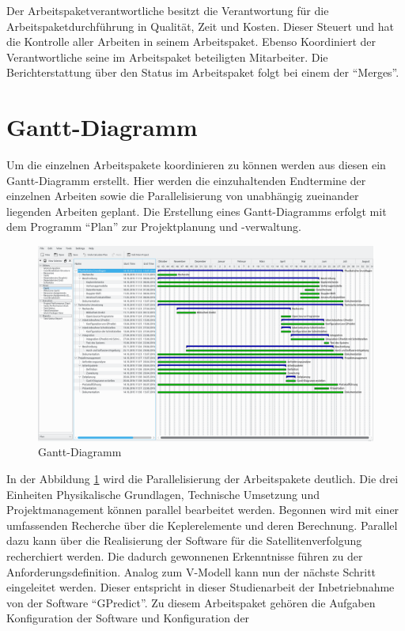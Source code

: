 Der Arbeitspaketverantwortliche besitzt die Verantwortung für die Arbeitspaketdurchführung in 
Qualität, Zeit und Kosten. Dieser Steuert und hat die Kontrolle aller Arbeiten in seinem 
Arbeitspaket. Ebenso Koordiniert der Verantwortliche seine im Arbeitspaket beteiligten Mitarbeiter. 
Die Berichterstattung über den Status im Arbeitspaket folgt bei einem der ``Merges''.
\newpar

\section{Gantt-Diagramm}
Um die einzelnen Arbeitspakete koordinieren zu können werden aus diesen ein Gantt-Diagramm 
erstellt. Hier werden die einzuhaltenden Endtermine der einzelnen Arbeiten sowie die 
Parallelisierung von unabhängig zueinander liegenden Arbeiten geplant. Die Erstellung eines Gantt-Diagramms erfolgt mit dem Programm ``Plan'' zur 
Projektplanung und -verwaltung. 
\begin{figure}[h] 
 \centering
\includegraphics[width=1.0\linewidth]{./images/gantt}
\caption{Gantt-Diagramm}
 \label{fig:gantt}
\end{figure}
In der Abbildung \ref{fig:gantt} wird die Parallelisierung der Arbeitspakete deutlich. Die drei Einheiten Physikalische Grundlagen, Technische 
Umsetzung 
und Projektmanagement können parallel bearbeitet werden. Begonnen wird mit einer umfassenden Recherche über die Keplerelemente und deren Berechnung. 
Parallel dazu kann über die  Realisierung der Software für die Satellitenverfolgung recherchiert werden. Die dadurch gewonnenen Erkenntnisse führen 
zu der Anforderungsdefinition. Analog zum V-Modell kann nun der nächste Schritt eingeleitet werden. Dieser entspricht in dieser Studienarbeit der 
Inbetriebnahme von der Software ``GPredict''. Zu diesem Arbeitspaket gehören die Aufgaben Konfiguration der Software und Konfiguration der 
